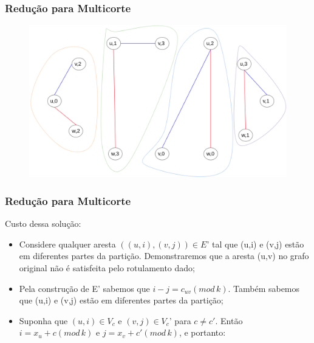 \documentclass[11pt, handout]{beamer}
\begin{document}
\begin{frame}
    \frametitle{Redução para Multicorte}
    
    \begin{figure}
        \centering
        \includegraphics[width=1\textwidth]{images/RemovedEdges.png}
    \end{figure}{}
    
\end{frame}

\begin{frame}[<+->]
    \frametitle{Redução para Multicorte}
        Custo dessa solução:
        \begin{itemize}
            \item Considere qualquer aresta $((u,i),(v,j)) \in E’$ tal que (u,i) e (v,j) estão em diferentes partes da partição. Demonstraremos que a aresta (u,v) no grafo original não é satisfeita pelo rotulamento dado;
            \item Pela construção de E’ sabemos que $i-j=c_{uv}(mod\,k)$. Também sabemos que (u,i) e (v,j) estão em diferentes partes da partição;
            \item Suponha que $(u,i) \in V_c$ e $(v,j) \in V_c$' para $c \ne c'$. Então $i=x_u+c(mod\,k)$ e $j=x_v+c'(mod\,k)$, e portanto:
        \end{itemize}
\end{frame}{}
\end{document}

